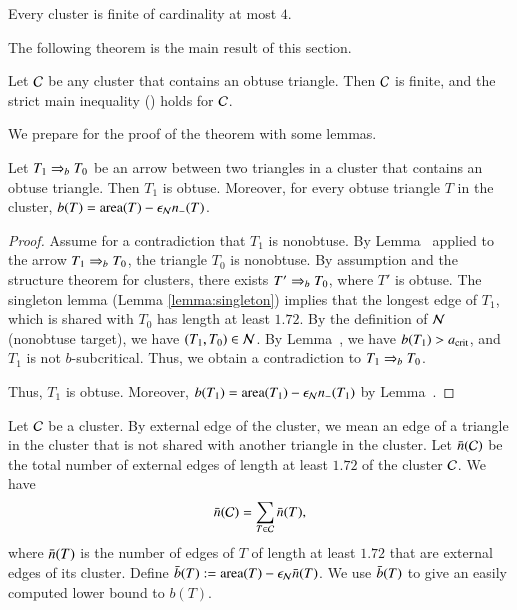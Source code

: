 \begin{corollary}
  Every cluster is finite of cardinality at most $4$.
\end{corollary}


The following theorem is the main result of this
section.

\begin{theorem}  
  Let $\mathcal C$ be any cluster that contains an obtuse triangle.  Then $\mathcal C$
  is finite, and the strict main inequality ()
  holds for $\mathcal C$.
\end{theorem}

We prepare for the proof of the theorem with some lemmas.

\begin{lemma} \label{lemma:obtuse-source} 
  Let $T_1\Rightarrow_{b} T_0$ be an
  arrow between two triangles in a cluster that contains an obtuse
  triangle.  Then $T_1$ is obtuse.  Moreover, for every obtuse
  triangle $T$ in the cluster, $b(T) = {\operatorname{area}}(T) -\epsilon_{\mathcal N} n_-(T)$.
\end{lemma}

\begin{proof} 
  Assume for a contradiction that $T_1$ is nonobtuse.  By
  Lemma~ applied to the arrow $T_1\Rightarrow_{b} T_0$, the
  triangle $T_0$ is nonobtuse.  By assumption and the structure
  theorem for clusters, there exists $T'\Rightarrow_{b} T_0$, where $T'$ is
  obtuse.  The singleton lemma (Lemma \ref{lemma:singleton}) implies
  that the longest edge of $T_1$, which is shared with $T_0$ has
  length at least $1.72$.  By the definition of $\mathcal N$ (nonobtuse
  target), we have $(T_1,T_0)\in\mathcal N$.  By Lemma~, we have
  $b(T_1)>a_\text{crit}$, and $T_1$ is not $b$-subcritical.  Thus, we obtain
  a contradiction to $T_1\Rightarrow_{b} T_0$.

 Thus, $T_1$ is obtuse.
  Moreover, $b(T_1) = {\operatorname{area}}(T_1) -\epsilon_{\mathcal N} n_-(T_1)$ by
  Lemma~.
\end{proof}

Let $\mathcal C$ be a cluster.  By external edge of the cluster, we mean an
edge of a triangle in the cluster that is not shared with another
triangle in the cluster.  Let $\bar n(\mathcal C)$ be the total number of
external edges of length at least $1.72$ of the cluster $\mathcal C$.  We have
\[
\bar n(\mathcal C) =\sum_{T\in \mathcal C} \bar n(T),
\]
where $\bar n(T)$ is the number of edges of $T$ of length at least $1.72$
that are external edges of its cluster.
Define $\bar b(T) := {\operatorname{area}}(T)-\epsilon_{\mathcal N}\bar n(T)$.  We use $\bar b(T)$ to give an
easily computed lower bound to $b(T)$.

